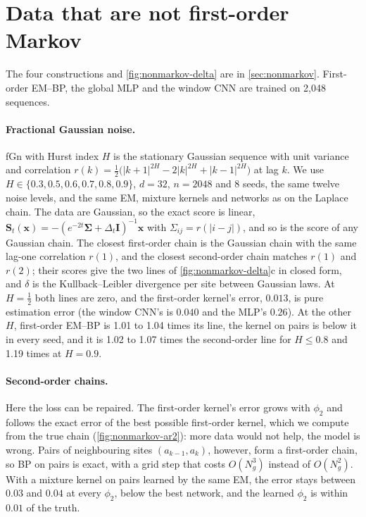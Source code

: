 \documentclass{article}
\begin{document}
\section{Data that are not first-order Markov}
\label{app:nonmarkov}

The four constructions and \cref{fig:nonmarkov-delta} are in \cref{sec:nonmarkov}. First-order EM--BP,
the global MLP and the window CNN are trained on 2{,}048 sequences.

\paragraph{Fractional Gaussian noise.} fGn with Hurst index $H$ is the stationary Gaussian sequence with unit
variance and correlation $r(k)=\frac12\big(|k+1|^{2H}-2|k|^{2H}+|k-1|^{2H}\big)$ at lag $k$. We use $H\in\{0.3,0.5,0.6,0.7,0.8,0.9\}$, $d=32$,
$n=2048$ and 8 seeds, the same twelve noise levels, and the same EM, mixture kernels and networks as on the Laplace
chain. The data are Gaussian, so the exact score is linear, $\mathbf S_t(\mathbf x)=-(e^{-2t}\boldsymbol\Sigma+
\Delta_t\mathbf I)^{-1}\mathbf x$ with $\Sigma_{ij}=r(|i-j|)$, and so is the score of any Gaussian chain. The closest
first-order chain is the Gaussian chain with the same lag-one correlation $r(1)$, and the closest second-order chain
matches $r(1)$ and $r(2)$; their scores give the two lines of \cref{fig:nonmarkov-delta}c in closed form, and $\delta$ is
the Kullback--Leibler divergence per site between Gaussian laws. At $H=\frac12$ both lines are zero, and the first-order
kernel's error, $0.013$, is pure estimation error (the window CNN's is $0.040$ and the MLP's $0.26$). At the other $H$,
first-order EM--BP is 1.01 to 1.04 times its line, the kernel on pairs is below it in every seed, and it is 1.02 to
1.07 times the second-order line for $H\le0.8$ and 1.19 times at $H=0.9$.

\paragraph{Second-order chains.} Here the loss can be repaired. The first-order kernel's error grows with $\phi_2$ and
follows the exact error of the best possible first-order kernel, which we compute from the true chain
(\cref{fig:nonmarkov-ar2}): more data would not help, the model is wrong. Pairs of neighbouring sites $(a_{k-1},a_k)$,
however, form a first-order chain, so BP on pairs is exact, with a grid step that costs $O(N_g^3)$ instead of
$O(N_g^2)$. With a mixture kernel on pairs learned by the same EM, the error stays between $0.03$ and $0.04$ at every
$\phi_2$, below the best network, and the learned $\phi_2$ is within $0.01$ of the truth.
\end{document}
